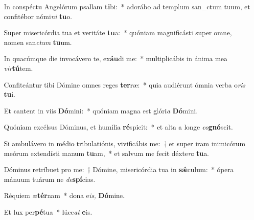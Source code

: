 \item In conspéctu Angelórum psallam \textbf{ti}bi:~* adorábo ad templum san\_ctum tuum, et confitébor nómi\textit{ni} \textbf{tu}o.
\item Super misericórdia tua et veritáte \textbf{tu}a:~* quóniam magnificásti super omne, nomen san\textit{ctum} \textbf{tu}um.
\item In quacúmque die invocávero te, ex\textbf{áu}di me:~* multiplicábis in ánima mea \textit{vir}\textbf{tú}tem.
\item Confiteántur tibi Dómine omnes reges \textbf{ter}ræ:~* quia audiérunt ómnia verba o\textit{ris} \textbf{tu}i.
\item Et cantent in viis \textbf{Dó}mini:~* quóniam magna est glóri\tinyhspace\textit{a} \textbf{Dó}mini.
\item Quóniam excélsus Dóminus, et humília \textbf{ré}spicit:~* et alta a longe \textit{co}\textbf{gnó}scit.
\item Si ambulávero in médio tribulatiónis, vivificábis me:~† et super iram inimicórum meórum extendísti manum \textbf{tu}am,~* et salvum me fecit déxte\tinyhspace\textit{ra} \textbf{tu}a.
\item Dóminus retríbuet pro me:~† Dómine, misericórdia tua in \textbf{sǽ}culum:~* ópera mánuum tuárum ne \textit{de}\textbf{spí}cias.
\item Réquiem æ\textbf{tér}nam~* dona e\textit{is,} \textbf{Dó}mine.
\item Et lux per\textbf{pé}tua~* lúce\textit{at} \textbf{e}is.